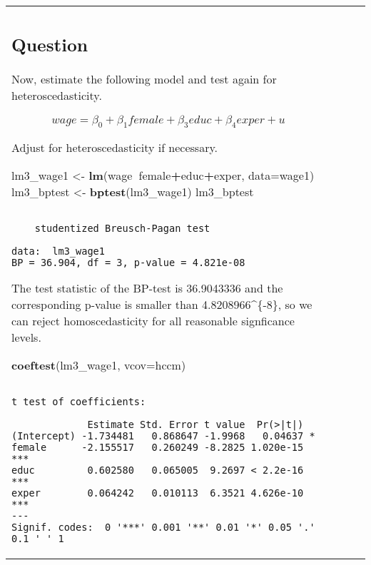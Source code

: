 \documentclass[12pt,]{article}
\newenvironment{Shaded}{\begin{snugshade}}{\end{snugshade}}
\newcommand{\DataTypeTok}[1]{\textcolor[rgb]{0.13,0.29,0.53}{#1}}
\newcommand{\KeywordTok}[1]{\textcolor[rgb]{0.13,0.29,0.53}{\textbf{#1}}}
\newcommand{\NormalTok}[1]{#1}
\newcommand{\OperatorTok}[1]{\textcolor[rgb]{0.81,0.36,0.00}{\textbf{#1}}}
\newcommand{\StringTok}[1]{\textcolor[rgb]{0.31,0.60,0.02}{#1}}
\begin{document}
\begin{tabularx}{0.5\textwidth}{p{} p{} p{} p{}}
\hypertarget{question-17}{%
\subsection{Question}\label{question-17}}

Now, estimate the following model and test again for heteroscedasticity.

\begin{equation}
wage = \beta_0 +  \beta_1  female +  \beta_3 educ + \beta_4 exper + u 
\end{equation}

Adjust for heteroscedasticity if necessary.

\begin{Shaded}
\begin{Highlighting}[]
\NormalTok{lm3_wage1 <-}\StringTok{ }\KeywordTok{lm}\NormalTok{(wage}\OperatorTok{~}\NormalTok{female}\OperatorTok{+}\NormalTok{educ}\OperatorTok{+}\NormalTok{exper, }\DataTypeTok{data=}\NormalTok{wage1)}
\NormalTok{lm3_bptest <-}\StringTok{ }\KeywordTok{bptest}\NormalTok{(lm3_wage1)}
\NormalTok{lm3_bptest}
\end{Highlighting}
\end{Shaded}

\begin{verbatim}

    studentized Breusch-Pagan test

data:  lm3_wage1
BP = 36.904, df = 3, p-value = 4.821e-08
\end{verbatim}

The test statistic of the BP-test is 36.9043336 and the corresponding
p-value is smaller than 4.8208966\times 10\^{}\{-8\}, so we can reject
homoscedasticity for all reasonable signficance levels.

\begin{Shaded}
\begin{Highlighting}[]
\KeywordTok{coeftest}\NormalTok{(lm3_wage1, }\DataTypeTok{vcov=}\NormalTok{hccm)}
\end{Highlighting}
\end{Shaded}

\begin{verbatim}

t test of coefficients:

             Estimate Std. Error t value  Pr(>|t|)    
(Intercept) -1.734481   0.868647 -1.9968   0.04637 *  
female      -2.155517   0.260249 -8.2825 1.020e-15 ***
educ         0.602580   0.065005  9.2697 < 2.2e-16 ***
exper        0.064242   0.010113  6.3521 4.626e-10 ***
---
Signif. codes:  0 '***' 0.001 '**' 0.01 '*' 0.05 '.' 0.1 ' ' 1
\end{verbatim}


\end{tabularx}
\end{document}
